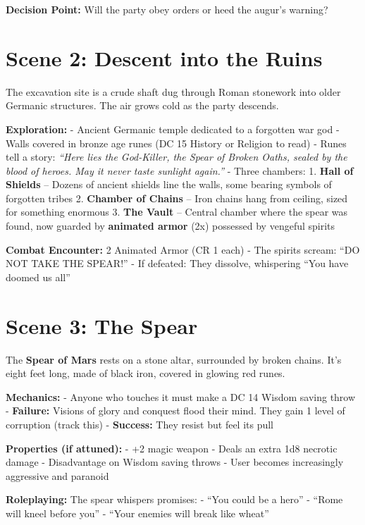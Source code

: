 \documentclass[
]{book}
\begin{document}
\textbf{Decision Point:} Will the party obey orders or heed the augur's
warning?

\section{Scene 2: Descent into the
Ruins}\label{scene-2-descent-into-the-ruins}

The excavation site is a crude shaft dug through Roman stonework into
older Germanic structures. The air grows cold as the party descends.

\textbf{Exploration:} - Ancient Germanic temple dedicated to a forgotten
war god - Walls covered in bronze age runes (DC 15 History or Religion
to read) - Runes tell a story: \emph{``Here lies the God-Killer, the
Spear of Broken Oaths, sealed by the blood of heroes. May it never taste
sunlight again.''} - Three chambers: 1. \textbf{Hall of Shields} --
Dozens of ancient shields line the walls, some bearing symbols of
forgotten tribes 2. \textbf{Chamber of Chains} -- Iron chains hang from
ceiling, sized for something enormous 3. \textbf{The Vault} -- Central
chamber where the spear was found, now guarded by \textbf{animated
armor} (2x) possessed by vengeful spirits

\textbf{Combat Encounter:} 2 Animated Armor (CR 1 each) - The spirits
scream: ``DO NOT TAKE THE SPEAR!'' - If defeated: They dissolve,
whispering ``You have doomed us all''

\section{Scene 3: The Spear}\label{scene-3-the-spear}

The \textbf{Spear of Mars} rests on a stone altar, surrounded by broken
chains. It's eight feet long, made of black iron, covered in glowing red
runes.

\textbf{Mechanics:} - Anyone who touches it must make a DC 14 Wisdom
saving throw - \textbf{Failure:} Visions of glory and conquest flood
their mind. They gain 1 level of corruption (track this) -
\textbf{Success:} They resist but feel its pull

\textbf{Properties (if attuned):} - +2 magic weapon - Deals an extra 1d8
necrotic damage - Disadvantage on Wisdom saving throws - User becomes
increasingly aggressive and paranoid

\textbf{Roleplaying:} The spear whispers promises: - ``You could be a
hero'' - ``Rome will kneel before you'' - ``Your enemies will break like
wheat''
\end{document}

